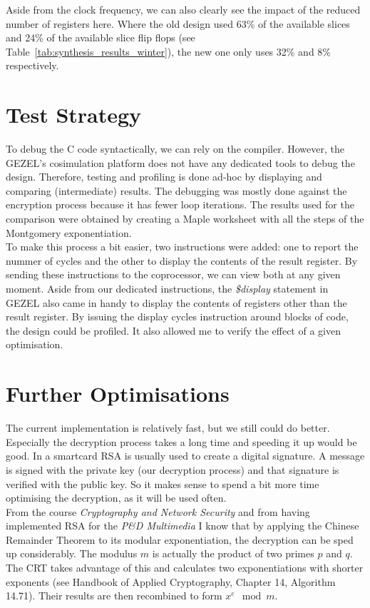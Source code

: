 \documentclass[a4paper]{article}
\begin{document}
Aside from the clock frequency, we can also clearly see the impact of the reduced number of registers here. Where the old design used 63\% of the available slices and 24\% of the available slice flip flops (see Table~\ref{tab:synthesis_results_winter}), the new one only uses 32\% and 8\% respectively.

\section{Test Strategy}

To debug the C code syntactically, we can rely on the compiler. However, the GEZEL's cosimulation platform does not have any dedicated tools to debug the design. Therefore, testing and profiling is done ad-hoc by displaying and comparing (intermediate) results. The debugging was mostly done against the encryption process because it has fewer loop iterations. The results used for the comparison were obtained by creating a Maple worksheet with all the steps of the Montgomery exponentiation.\\


To make this process a bit easier, two instructions were added: one to report the nummer of cycles and the other to display the contents of the result register. By sending these instructions to the coprocessor, we can view both at any given moment. Aside from our dedicated instructions, the \textit{\$display} statement in GEZEL also came in handy to display the contents of registers other than the result register. By issuing the display cycles instruction around blocks of code, the design could be profiled. It also allowed me to verify the effect of a given optimisation.

\section{Further Optimisations}

The current implementation is relatively fast, but we still could do better. Especially the decryption process takes a long time and speeding it up would be good. In a smartcard RSA is usually used to create a digital signature. A message is signed with the private key (our decryption process) and that signature is verified with the public key. So it makes sense to spend a bit more time optimising the decryption, as it will be used often.\\

From the course \textit{Cryptography and Network Security} and from having implemented RSA for the \textit{P\&D Multimedia} I know that by applying the Chinese Remainder Theorem to its modular exponentiation, the decryption can be sped up considerably. The modulus $m$ is actually the product of two primes $p$ and $q$. The CRT takes advantage of this and calculates two exponentiations with shorter exponents (see Handbook of Applied Cryptography, Chapter 14, Algorithm 14.71). Their results are then recombined to form $x^e\mod{m}$.
\end{document}
